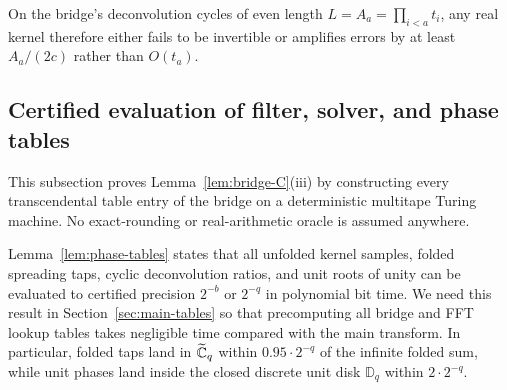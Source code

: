 On the bridge's deconvolution cycles of even length $L=A_a=\prod_{i<a}t_i$, any real kernel therefore either fails to be invertible or amplifies errors by at least $A_a/(2c)$ rather than $O(t_a)$.

\subsection{Certified evaluation of filter, solver, and phase tables}\label{sec:deferred-tables}

This subsection proves Lemma~\ref{lem:bridge-C}(iii) by constructing every transcendental table entry of the bridge on a deterministic multitape Turing machine. No exact-rounding or real-arithmetic oracle is assumed anywhere.

Lemma~\ref{lem:phase-tables} states that all unfolded kernel samples, folded spreading taps, cyclic deconvolution ratios, and unit roots of unity can be evaluated to certified precision $2^{-b}$ or $2^{-q}$ in polynomial bit time. We need this result in Section~\ref{sec:main-tables} so that precomputing all bridge and FFT lookup tables takes negligible time compared with the main transform. In particular, folded taps land in $\widetilde{\mathbb{C}}_q$ within $0.95\cdot 2^{-q}$ of the infinite folded sum, while unit phases land inside the closed discrete unit disk $\mathbb{D}_q$ within $2\cdot 2^{-q}$.

